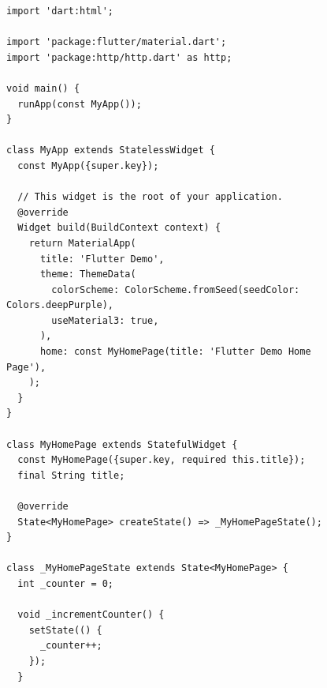 \documentclass[a4paper, 14pt]{extarticle}
\begin{document}
\begin{figure}[H]
\begin{lstlisting}[language={},caption={Реализация мобильного приложения},label={lst:code1}]
import 'dart:html';

import 'package:flutter/material.dart';
import 'package:http/http.dart' as http;

void main() {
  runApp(const MyApp());
}

class MyApp extends StatelessWidget {
  const MyApp({super.key});

  // This widget is the root of your application.
  @override
  Widget build(BuildContext context) {
    return MaterialApp(
      title: 'Flutter Demo',
      theme: ThemeData(
        colorScheme: ColorScheme.fromSeed(seedColor: Colors.deepPurple),
        useMaterial3: true,
      ),
      home: const MyHomePage(title: 'Flutter Demo Home Page'),
    );
  }
}

class MyHomePage extends StatefulWidget {
  const MyHomePage({super.key, required this.title});
  final String title;

  @override
  State<MyHomePage> createState() => _MyHomePageState();
}

class _MyHomePageState extends State<MyHomePage> {
  int _counter = 0;

  void _incrementCounter() {
    setState(() {
      _counter++;
    });
  }


\end{lstlisting}
\end{figure}
\end{document}
